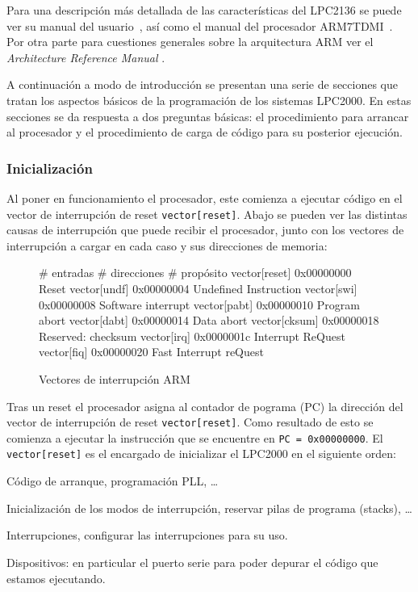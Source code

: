 \documentclass[10pt,a4paper]{article}
\newenvironment{itemize*}
        {\begin{itemize}%
                \setlength{\parskip}{2pt}%
                \setlength{\itemsep}{0pt}}
        {\end{itemize}}
\begin{document}
	Para una descripción más detallada de las características del LPC2136 se puede ver su manual del usuario~\cite{lpc213x-um}, así como el manual del procesador ARM7TDMI~\cite{arm7tdmi-s}. Por otra parte para cuestiones generales sobre la arquitectura ARM ver el \emph{Architecture Reference Manual} \cite{armarm}.
	
	A continuación a modo de introducción se presentan una serie de secciones que tratan los aspectos básicos de la programación de los sistemas LPC2000. En estas secciones se da respuesta a dos preguntas básicas: el procedimiento para arrancar al procesador y el procedimiento de carga de código para su posterior ejecución.
	
	\subsubsection{Inicialización}
	
	Al poner en funcionamiento el procesador, este comienza a ejecutar código en el vector de interrupción de reset \texttt{vector[reset]}. Abajo se pueden ver las distintas causas de interrupción que puede recibir el procesador, junto con los vectores de interrupción a cargar en cada caso y sus direcciones de memoria:

	\begin{figure}[htbp]
	\centering

	\begin{boxedverbatim}
	# entradas      # direcciones  # propósito
	vector[reset]   0x00000000     Reset
	vector[undf]    0x00000004     Undefined Instruction
	vector[swi]     0x00000008     Software interrupt
	vector[pabt]    0x00000010     Program abort
	vector[dabt]    0x00000014     Data abort
	vector[cksum]   0x00000018     Reserved: checksum
	vector[irq]     0x0000001c     Interrupt ReQuest
	vector[fiq]     0x00000020     Fast Interrupt reQuest
	\end{boxedverbatim}
	\caption{Vectores de interrupción ARM}\label{fig:vector}
	\end{figure}
	
	Tras un reset el procesador asigna al contador de pograma (PC) la dirección del vector de interrupción de reset \texttt{vector[reset]}. Como resultado de esto se comienza a ejecutar la instrucción que se encuentre en \texttt{PC = 0x00000000}. El \texttt{vector[reset]} es el encargado de inicializar el LPC2000 en el siguiente orden:
	
	\begin{itemize*}
	\item Código de arranque, programación PLL, \ldots
	\item Inicialización de los modos de interrupción, reservar pilas de programa (stacks), \ldots
	\item Interrupciones, configurar las interrupciones para su uso.
	\item Dispositivos: en particular el puerto serie para poder depurar el código que estamos ejecutando.
	\end{itemize*}
	
\end{document}
